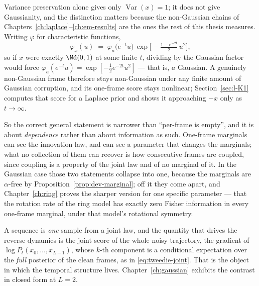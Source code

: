 \begin{remark}\label{rmk:dev-nongaussian}
Variance preservation alone gives only $\operatorname{Var}(x) = 1$; it does not give
Gaussianity, and the distinction matters because the non-Gaussian chains of
Chapters~\ref{ch:laplace}--\ref{ch:em-results} are the ones the rest of this
thesis measures. Writing $\varphi$ for characteristic functions,
\begin{equation}
  \varphi_{x}(u) \;=\; \varphi_a\!\big(e^{-t}u\big)\,
  \exp\!\Big[-\tfrac{1 - e^{-2t}}{2}\,u^2\Big],
  \label{eq:dev-cf}
\end{equation}
so if $x$ were exactly $\Nd(0,1)$ at some finite $t$, dividing by the Gaussian
factor would force
$\varphi_a(e^{-t}u) = \exp[-\tfrac{1}{2}e^{-2t}u^2]$ --- that is, $a$ Gaussian.
A genuinely non-Gaussian frame therefore stays non-Gaussian under any finite
amount of Gaussian corruption, and its one-frame score stays nonlinear;
Section~\ref{sec:l-K1} computes that score for a Laplace prior and shows it
approaching $-x$ only as $t \to \infty$.
\end{remark}

\noindent So the correct general statement is narrower than
``per-frame is empty'', and it is about \emph{dependence} rather than about
information as such. One-frame marginals can see the innovation law, and can
see a parameter that changes the marginals; what no collection of them can
recover is how consecutive frames are coupled, since coupling is a property of
the joint law and of no marginal of it. In the Gaussian case those two
statements collapse into one, because the marginals are $\alpha$-free by
Proposition~\ref{prop:dev-marginal}; off it they come apart, and
Chapter~\ref{ch:ring} proves the sharper version for one specific parameter ---
that the rotation rate of the ring model has exactly zero Fisher information in
every one-frame marginal, under that model's rotational symmetry.

A sequence is \emph{one} sample from a joint law, and the quantity that
drives the reverse dynamics is the joint score of the whole noisy trajectory,
the gradient of $\log P_t(x_0, \dots, x_{L-1})$, whose $k$-th component is a
conditional expectation over the \emph{full} posterior of the clean frames,
as in \eqref{eq:tweedie-joint}. That is the object in which the temporal
structure lives. Chapter~\ref{ch:gaussian} exhibits the contrast in closed form
at $L = 2$.

